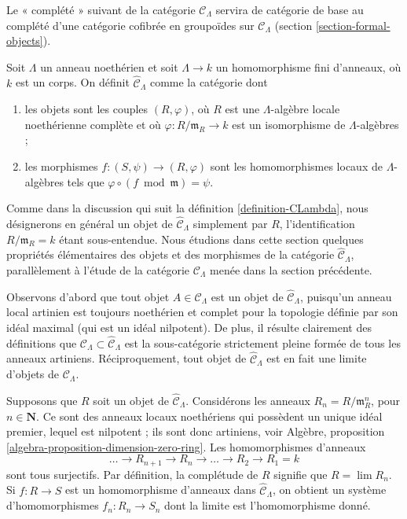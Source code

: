 \noindent
Le « complété » suivant de la catégorie $\mathcal{C}_\Lambda$ servira de
catégorie de base au complété d'une catégorie cofibrée en groupoïdes sur
$\mathcal{C}_\Lambda$ (section \ref{section-formal-objects}).

\begin{definition}
\label{definition-completion-CLambda}
Soit $\Lambda$ un anneau noethérien et soit $\Lambda \to k$ un homomorphisme
fini d'anneaux, où $k$ est un corps. On définit
{\it $\widehat{\mathcal{C}}_\Lambda$} comme la catégorie dont
\begin{enumerate}
\item les objets sont les couples $(R, \varphi)$, où $R$ est une
$\Lambda$-algèbre locale noethérienne complète et où
$\varphi : R/\mathfrak m_R \to k$ est un isomorphisme de
$\Lambda$-algèbres ;
\item les morphismes $f : (S, \psi) \to (R, \varphi)$ sont les
homomorphismes locaux de $\Lambda$-algèbres tels que
$\varphi \circ (f \bmod \mathfrak m) = \psi$.
\end{enumerate}
\end{definition}

\noindent
Comme dans la discussion qui suit la définition \ref{definition-CLambda}, nous
désignerons en général un objet de $\widehat{\mathcal{C}}_\Lambda$ simplement
par $R$, l'identification
$R/\mathfrak m_R = k$ étant sous-entendue. Nous étudions dans cette section
quelques propriétés élémentaires des objets et des morphismes de la catégorie
$\widehat{\mathcal{C}}_\Lambda$, parallèlement à l'étude de la catégorie
$\mathcal{C}_\Lambda$ menée dans la section précédente.

\medskip\noindent
Observons d'abord que tout objet $A \in \mathcal{C}_\Lambda$ est un objet de
$\widehat{\mathcal{C}}_\Lambda$, puisqu'un anneau local artinien est toujours
noethérien et complet pour la topologie définie par son idéal maximal (qui est
un idéal nilpotent). De plus, il résulte clairement des définitions que
$\mathcal{C}_\Lambda \subset \widehat{\mathcal{C}}_\Lambda$
est la sous-catégorie strictement pleine formée de tous les anneaux artiniens.
Réciproquement, tout objet de $\widehat{\mathcal{C}}_\Lambda$ est en fait une
limite d'objets de $\mathcal{C}_\Lambda$.

\medskip\noindent
Supposons que $R$ soit un objet de $\widehat{\mathcal{C}}_\Lambda$.
Considérons les anneaux $R_n = R/\mathfrak m_R^n$, pour
$n \in \mathbf{N}$. Ce sont des anneaux locaux noethériens qui possèdent un
unique idéal premier, lequel est nilpotent ; ils sont donc artiniens, voir
Algèbre, proposition \ref{algebra-proposition-dimension-zero-ring}.
Les homomorphismes d'anneaux
$$
\ldots \to R_{n + 1} \to R_n \to \ldots \to R_2 \to R_1 = k
$$
sont tous surjectifs. Par définition, la complétude de $R$ signifie que
$R = \lim R_n$. Si $f : R \to S$ est un homomorphisme d'anneaux dans
$\widehat{\mathcal{C}}_\Lambda$, on obtient un système d'homomorphismes
$f_n : R_n \to S_n$ dont la limite est l'homomorphisme donné.

